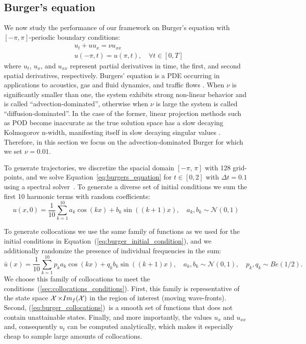 \subsection{Burger's equation}
\label{sec:burger_eqn}
We now study the performance of our framework on Burger's equation with $[-\pi, \pi]$-periodic boundary conditions:
\begin{equation}
\begin{split}
\label{eq:burgers_equation}
    & u_t  + uu_x = \nu u_{xx} \\
    & u(-\pi, t) = u(\pi, t),\quad \forall t \in [0, T]
\end{split}
\end{equation}
where $u_t$, $u_x$, and $u_{xx}$ represent partial derivatives in time, the first, and second spatial derivatives, respectively. Burgers' equation is a PDE occurring in applications to acoustics, gas and fluid dynamics, and traffic flows \cite{burgers1948mathematical}. When $\nu$ is significantly smaller than one, the system exhibits strong non-linear behavior and is called ``advection-dominated'', otherwise when $\nu$ is large the system is called ``diffusion-dominated''. 
In the case of the former, linear projection methods such as POD become inaccurate as the true solution space has a slow decaying Kolmogorov n-width, manifesting itself in slow decaying singular values \cite{peherstorfer2022breaking}. Therefore, in this section we focus on the advection-dominated Burger for which we set $\nu = 0.01$.


To generate trajectories, we discretize the spacial domain $[-\pi,\,\pi]$ with 128 grid-points, and we solve Equation~\ref{eq:burgers_equation} for $t \in [0, 2]$ with $\Delta t = 0.1$ using a spectral solver~\cite{trefethen2000spectral}. To generate a diverse set of initial conditions we sum the first 10 harmonic terms with random coefficients:
\begin{equation}
    \label{eq:burger_initial_condition}
    u(x, 0) = \frac{1}{10}\sum_{k = 1}^{10} a_k\cos(kx) + b_k\sin((k+1)x), \quad a_k, b_k \sim \mathcal{N}(0, 1)
\end{equation}

To generate collocations we use the same family of functions as we used for the initial conditions in Equation~(\ref{eq:burger_initial_condition}), and we additionally randomize the presence of individual frequencies in the sum:
\begin{equation}
    \label{eq:burger_collocations}
    \bar{u}(x) = \frac{1}{10}\sum_{k = 1}^{10} p_ka_k\cos(kx) + q_kb_k\sin((k+1)x), \quad a_k, b_k \sim \mathcal{N}(0, 1), \quad p_k, q_k \sim Be(1/2).
\end{equation}
We choose this family of collocations to meet the conditions~(\ref{sec:collocations_conditions}). First, this family is representative of the state space $\operatorname{\mathcal{X}}\times Im_f(\operatorname{\mathcal{X}})$ in the region of interest (moving wave-fronts). Second, (\ref{eq:burger_collocations})~is a smooth set of functions that does not contain unattainable states. Finally, and more importantly, the values $u_x$ and $u_{xx}$ and, consequently $u_t$ can be computed analytically, which makes it especially cheap to sample large amounts of collocations. 

